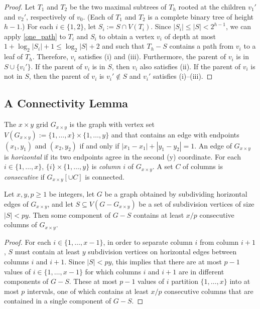 \documentclass{patmorin}
\newcommand{\defin}[1]{\emph{\color{brightmaroon}#1}}
\renewcommand{\le}{\leqslant}
\renewcommand{\ge}{\geqslant}
\begin{document}
\begin{proof}
  Let $T_1$ and $T_2$ be the two maximal subtrees of $T_h$ rooted at the children $v_1'$ and $v_2'$, respectively of $v_0$. (Each of $T_1$ and $T_2$ is a complete binary tree of height $h-1$.)  For each $i\in\{1,2\}$, let $S_i:=S\cap V(T_i)$.  Since $|S_i|\le |S|< 2^{h-1}$, we can apply \cref{one_path} to $T_i$ and $S_i$ to obtain a vertex $v_i$ of depth at most $1+\log_2|S_i|+1 \le \log_2 |S| + 2$ and such that $T_h-S$ contains a path from $v_i$ to a leaf of $T_h$.  Therefore, $v_i$ satisfies (i) and (iii).  Furthermore, the parent of $v_i$ is in $S\cup\{v_i'\}$.  If the parent of $v_i$ is in $S$, then $v_i$ also satisfies (ii).  If the parent of $v_i$ is not in $S$, then the parent of $v_i$ is $v_i'\not\in S$ and $v_i'$ satisfies (i)--(iii).
\end{proof}

\subsection{A Connectivity Lemma}

The $x\times y$ grid $G_{x\times y}$ is the graph with vertex set $V(G_{x\times y}):=\{1,\ldots,x\}\times\{1,\ldots,y\}$ and that contains an edge with endpoints $(x_1,y_1)$ and $(x_2,y_2)$ if and only if $|x_1-x_1|+|y_1-y_2|=1$.  An edge of $G_{x\times y}$ is \defin{horizontal} if its two endpoints agree in the second (y) coordinate.  For each $i\in\{1,\ldots,x\}$, $\{i\}\times\{1,\ldots,y\}$ is \defin{column $i$} of $G_{x\times y}$.  A set $C$ of columns is \defin{consecutive} if $G_{x\times y}[\cup C]$ is connected.


\begin{lem}\label{grid_connectivity}
  Let $x,y,p\ge 1$ be integers, let $G$ be a graph obtained by subdividing horizontal edges of $G_{x\times y}$, and let $S\subseteq V(G-G_{x\times y})$ be a set of subdivision vertices of size $|S|< py$.  Then some component of $G-S$ contains at least $x/p$ consecutive columns of $G_{x\times y}$.
\end{lem}

\begin{proof}
  For each $i\in\{1,\ldots,x-1\}$, in order to separate column $i$ from column $i+1$, $S$ must contain at least $y$ subdivision vertices on horizontal edges between columns $i$ and $i+1$.  Since $|S|< py$, this implies that there are at most $p-1$ values of $i\in\{1,\ldots,x-1\}$ for which columns $i$ and $i+1$ are in different components of $G-S$. These at most $p-1$ values of $i$ partition $\{1,\ldots,x\}$ into at most $p$ intervals, one of which contains at least $x/p$ consecutive columns that are contained in a single component of $G-S$.
\end{proof}
\end{document}
